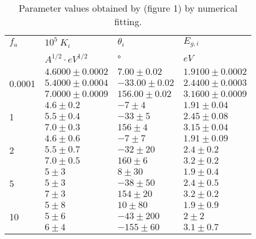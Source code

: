 \begin{table}[thb]
\small
\centering
\begin{tabular}{ p{1cm}|p{}|p{}| p{}}
\toprule
 $f_a$ & $10^5 \ K_i$ & $\theta _i$ &  $E_{g,i}$\\
 & $A^{1/2} \cdot eV^{1/2}$ & ° & $eV$\\
\midrule
\multirow{3}{*}{0.0001} & $4.6000 \pm 0.0002$    & $7.00 \pm 0.02$ &   $1.9100 \pm 0.0002$\\
                                   & $5.4000 \pm 0.0004$    & $-33.00 \pm 0.02$ &   $2.4400 \pm 0.0003$\\
                                   & $7.0000 \pm 0.0009$    & $156.00 \pm 0.02$ &   $3.1600 \pm 0.0009$\\
                                   
\midrule
\multirow{3}{*}{1}        & $4.6 \pm 0.2$    & $-7 \pm 4$ &   $1.91 \pm 0.04$\\
                                   & $5.5 \pm 0.4$    & $-33 \pm 5$ &   $2.45 \pm 0.08$\\
                                   & $7.0 \pm 0.3$    & $156 \pm 4$ &   $3.15 \pm 0.04$\\
                                  
\midrule
\multirow{3}{*}{2}        & $4.6 \pm 0.6$    & $-7 \pm 7$ &   $1.91 \pm 0.09$\\
                                   & $5.5 \pm 0.7$    & $-32 \pm 20$ &   $2.4 \pm 0.2$\\
                                   & $7.0 \pm 0.5$    & $160 \pm 6$ &   $3.2 \pm 0.2$\\      
                                   
\midrule
\multirow{3}{*}{5}        & $5 \pm 3$    & $8 \pm 30$ &   $1.9 \pm 0.4$\\
                                   & $5 \pm 3$    & $-38 \pm 50$ &   $2.4 \pm 0.5$\\
                                   & $7 \pm 3$    & $154 \pm 20$ &   $3.2 \pm 0.2$\\        
                                   
\midrule
\multirow{3}{*}{10}        & $5 \pm 8$    & $10 \pm 80$ &   $1.9 \pm 0.9$\\
                                   & $5 \pm 6$    & $-43 \pm 200$ &   $2 \pm 2$\\
                                   & $6 \pm 4$    & $-155 \pm 60$ &   $3.1 \pm 0.7$\\                                   


\bottomrule
\end{tabular}
\caption{Parameter values obtained by \citet{petit2013} (figure 1) by numerical fitting.}
\label{table:result_fit_noise}
\end{table}
 
